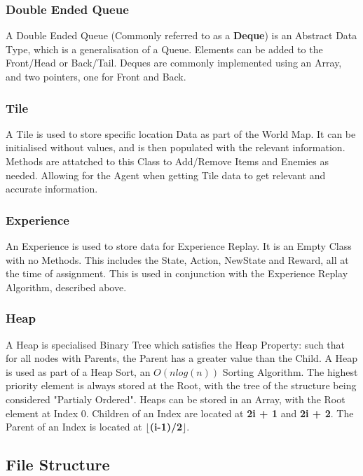 \begin{flushleft}
            \subsubsection{Double Ended Queue} 
                A Double Ended Queue (Commonly referred to as a {\textbf{Deque}}) is an Abstract Data Type, which is a generalisation of 
                a Queue. Elements can be added to the Front/Head or Back/Tail. Deques are commonly implemented using an Array, and two
                pointers, one for Front and Back.
            \subsubsection{Tile} 
                A Tile is used to store specific location Data as part of the World Map. It can be initialised without values, and is
                then populated with the relevant information. Methods are attatched to this Class to Add/Remove Items and Enemies as needed.
                Allowing for the Agent when getting Tile data to get relevant and accurate information.
            \subsubsection{Experience} 
                An Experience is used to store data for Experience Replay. It is an Empty Class with no Methods. This includes the State, 
                Action, NewState and Reward, all at the time of assignment. This is used in conjunction with the Experience Replay 
                Algorithm, described above.
            \subsubsection{Heap} 
                A Heap is specialised Binary Tree which satisfies the Heap Property: such that for all nodes with Parents, the
                Parent has a greater value than the Child. A Heap is used as part of a Heap Sort, an $O(nlog(n))$ Sorting Algorithm. The
                highest priority element is always stored at the Root, with the tree of the structure being considered "Partialy Ordered".
                Heaps can be stored in an Array, with the Root element at Index 0. Children of an Index are located at \textbf{2i + 1} and
                \textbf{2i + 2}. The Parent of an Index is located at \textbf{$\lfloor$(i-1)/2$\rfloor$}.
        \subsection{File Structure}

\end{flushleft}

